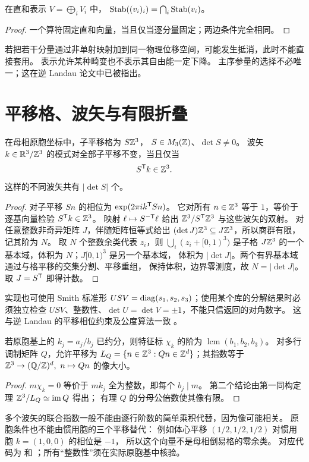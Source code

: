 \begin{proposition}[耦合序参量]
在直和表示 $V=\bigoplus_i V_i$ 中，
$\operatorname{Stab}((v_i)_i)=\bigcap_i\operatorname{Stab}(v_i)$。
\end{proposition}
\begin{proof}
一个算符固定直和向量，当且仅当逐分量固定；两边条件完全相同。
\end{proof}
若把若干分量通过非单射映射加到同一物理位移空间，可能发生抵消，此时不能直接套用。
表示允许某种畸变也不表示其自由能一定下降。
主序参量的选择不必唯一；这在逆 Landau 论文中已被指出\citep{Hatch2002,Coupled1991}。

\section{平移格、波矢与有限折叠}\label{sec:lattice}
\begin{theorem}[超胞与波矢的精确相容性]
在母相原胞坐标中，子平移格为 $S\mathbb Z^3$，
$S\in M_3(\mathbb Z)$、$\det S\ne0$。
波矢 $k\in\mathbb R^3/\mathbb Z^3$ 的模式对全部子平移不变，当且仅当
\[
 S^\mathsf T k\in\mathbb Z^3.
\]
这样的不同波矢共有 $|\det S|$ 个。
\end{theorem}
\begin{proof}
对子平移 $Sn$ 的相位为 $\exp(2\pi i k^\mathsf T Sn)$。
它对所有 $n\in\mathbb Z^3$ 等于 $1$，等价于逐基向量检验
$S^\mathsf T k\in\mathbb Z^3$。
映射 $\ell\mapsto S^{-\mathsf T}\ell$ 给出
$\mathbb Z^3/S^\mathsf T\mathbb Z^3$ 与这些波矢的双射。
对任意整数非奇异矩阵 $J$，伴随矩阵恒等式给出
$(\det J)\mathbb Z^3\subseteq J\mathbb Z^3$，所以商群有限，记其阶为 $N$。
取 $N$ 个整数余类代表 $z_i$，则 $\bigcup_i(z_i+[0,1)^3)$
是子格 $J\mathbb Z^3$ 的一个基本域，体积为 $N$；$J[0,1)^3$ 是另一个基本域，
体积为 $|\det J|$。两个有界基本域通过与格平移的交集分割、平移重组，
保持体积，边界零测度，故 $N=|\det J|$。取 $J=S^\mathsf T$ 即得计数。
\end{proof}
实现也可使用 Smith 标准形 $USV=\operatorname{diag}(s_1,s_2,s_3)$；使用某个库的分解结果时必须独立检查
$USV$、整数性、$\det U=\det V=\pm1$，不能只信返回的对角数字。
这与逆 Landau 的平移相位约束及公度算法一致
\citep{Hatch2002,Stokes2017}。

\begin{proposition}[有理相位阶数]
若原胞基上的 $k_j=a_j/b_j$ 已约分，则特征标 $\chi_k$ 的阶为
$\operatorname{lcm}(b_1,b_2,b_3)$。
对多行调制矩阵 $Q$，允许平移为
$L_Q=\{n\in\mathbb Z^3:Qn\in\mathbb Z^d\}$；其指数等于
$\mathbb Z^3\to(\mathbb Q/\mathbb Z)^d,\ n\mapsto Qn$ 的像大小。
\end{proposition}
\begin{proof}
$m\chi_k=0$ 等价于 $mk_j$ 全为整数，即每个 $b_j\mid m$。
第二个结论由第一同构定理 $\mathbb Z^3/L_Q\simeq\operatorname{im} Q$ 得出；
有理 $Q$ 的分母公倍数使其像有限。
\end{proof}
多个波矢的联合指数一般不能由逐行阶数的简单乘积代替，因为像可能相关。
原胞条件也不能由惯用胞的三个平移替代：
例如体心平移 $(1/2,1/2,1/2)$ 对惯用胞 $k=(1,0,0)$ 的相位是 $-1$，
所以这个向量不是母相倒易格的零余类。
对应代码为  和
；所有“整数性”须在实际原胞基中核验。

